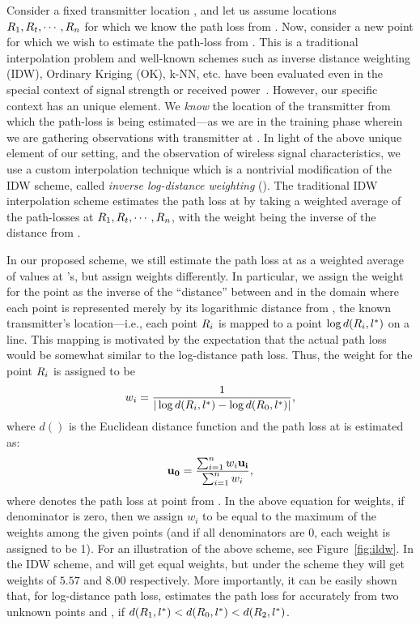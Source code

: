  Consider a fixed transmitter
location \lstar, and let us assume locations $R_1, R_t, \cdots, R_n$ for
which we know the path loss from \lstar. Now, consider a new point \lz
for which we wish to estimate the path-loss from \lstar.
This is a traditional interpolation problem and well-known schemes
such as inverse distance weighting (IDW), Ordinary Kriging (OK), k-NN,
etc. have been evaluated even in the special context of signal
strength or received power~\cite{chakraborty2017specsense}.
However, our specific context has an unique element. We
{\em know} the location \lstar of the transmitter from which the
path-loss is being estimated---as we are in the training phase wherein
we are gathering observations with transmitter at \lstar.
In light of the above unique element of our setting, and the observation of wireless signal characteristics, we use a custom
interpolation technique which is a nontrivial modification of the IDW
scheme, called {\em inverse log-distance weighting} (\ildw). The traditional
IDW interpolation scheme estimates the
path loss at \lz by taking a weighted average of the path-losses at
$R_1, R_t, \cdots, R_n$, with the weight being the inverse of the
distance from \lz. 

In our proposed \ildw scheme, we still estimate the path loss at \lz as
a weighted average of values at \li's, but assign weights differently.
In particular, we assign the weight for the point \li as the inverse
of the ``distance'' between \lz and \li in the domain where each point
is represented merely by its logarithmic distance from \lstar, the known
transmitter's location---i.e., each point $R_i$ is mapped to a point
$\log d(R_i, l^*)$ on a line. This mapping is motivated by the
expectation that the actual path loss would be somewhat similar to the
log-distance path loss.
Thus, the weight for the point $R_i$ is assigned to be
$$w_i = \frac{1}{|\log d(R_i, l^*) - \log d(R_0, l^*)|},$$ where $d()$ is the
Euclidean distance function and the path loss at \lz is estimated as:
$$\mathbf{u_0} = \frac{\sum_{i=1}^{n}w_i \mathbf{u_i}}{\sum_{i=1}^{n}w_i},$$ where \ui
denotes the path loss at point \li from \lstar. In the above equation for
weights, if denominator is zero, then we assign $w_i$ to be equal to
the maximum of the weights among the given points (and if all
denominators are 0, each weight is assigned to be 1).
For an illustration of the above scheme, see Figure~\ref{fig:ildw}.
In the IDW scheme, \lo and \lt will get equal weights, but under the
\ildw scheme they will get weights of $5.57$ and $8.00$
respectively. More importantly, it can be easily shown that, for
log-distance path loss, \ildw estimates the path loss for \lz accurately
from two unknown points \lo and \lt, if $d(R_1, l^*) < d(R_0,
l^*) < d(R_2, l^*)$.

